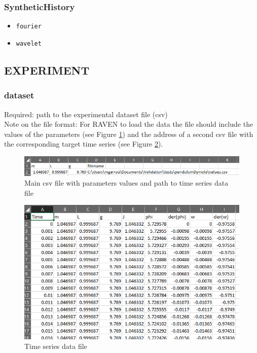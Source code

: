 \documentclass[oneside]{book}
\begin{document}
\subsubsection{SyntheticHistory}
\begin{itemize}
    \item \verb|fourier|
    \item \verb|wavelet|
\end{itemize}

\FloatBarrier
\subsection{EXPERIMENT}
\subsubsection{dataset} Required: path to the experimental dataset file (csv)
\\Note on the file format: For RAVEN to load the data the file should include the values of the parameters (see Figure \ref{fig:dummy_exp_values}) and the address of a second csv file with the corresponding target time series (see Figure \ref{fig:values}). 

\begin{figure}
    \centering
    \includegraphics[width=\textwidth]{pics/dummy_exp_values.PNG}
    \caption{Main csv file with parameters values and path to time series data file}
    \label{fig:dummy_exp_values}
\end{figure}

\begin{figure}
    \centering
    \includegraphics[width=\textwidth]{pics/values.PNG}
    \caption{Time series data file}
    \label{fig:values}
\end{figure}
\end{document}
